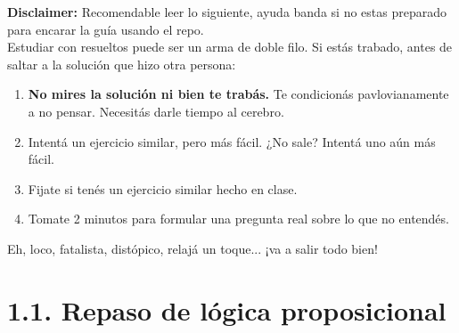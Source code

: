 \begin{disclaimerbox}
\textbf{Disclaimer:} Recomendable leer lo siguiente, ayuda banda si no estas preparado para encarar la guía usando el repo. \\

Estudiar con resueltos puede ser un arma de doble filo. Si estás trabado, antes de saltar a la solución que hizo otra persona:
\begin{enumerate}
    \item \textbf{No mires la solución ni bien te trabás.} Te condicionás pavlovianamente a no pensar. Necesitás darle tiempo al cerebro.
    \item Intentá un ejercicio similar, pero más fácil. ¿No sale? Intentá uno aún más fácil.
    \item Fijate si tenés un ejercicio similar hecho en clase.
    \item Tomate 2 minutos para formular una pregunta real sobre lo que no entendés.
\end{enumerate}
Eh, loco, fatalista, distópico, relajá un toque... ¡va a salir todo bien!
\end{disclaimerbox}

\newpage

\section*{1.1. Repaso de lógica proposicional}






